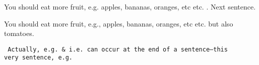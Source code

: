 \documentclass{article}
\makeatletter
\newcommand*{\eg}{e.g.\@\xspace}
\newcommand*{\etc}{%
    \@ifnextchar{.}%
        {etc}%
        {etc.\@\xspace}%
}
\makeatother
\begin{document}
\noindent
You should eat more fruit, \eg apples, bananas, oranges, \etc. Next sentence.

\noindent
You should eat more fruit, \eg, apples, bananas, oranges, \etc but also 
tomatoes.

\noindent
\begin{verbatim}
 Actually, e.g. & i.e. can occur at the end of a sentence―this 
very sentence, e.g.
\end{verbatim}
\end{document}
